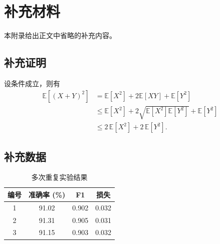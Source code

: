 
\chapter{补充材料}

本附录给出正文中省略的补充内容。

\section{补充证明}

设条件成立，则有
\begin{equation}
\begin{aligned}
\mathbb{E}[(X+Y)^2] &= \mathbb{E}[X^2] + 2\mathbb{E}[XY] + \mathbb{E}[Y^2] \\
&\leq \mathbb{E}[X^2] + 2\sqrt{\mathbb{E}[X^2]\mathbb{E}[Y^2]} + \mathbb{E}[Y^2] \\
&\leq 2\,\mathbb{E}[X^2] + 2\,\mathbb{E}[Y^2].
\end{aligned}
\end{equation}

\section{补充数据}

\begin{table}[htbp]
\centering
\caption{多次重复实验结果}
\begin{tabular}{cccc}
\toprule
编号 & 准确率 (\%) & F1 & 损失 \\
\midrule
1 & 91.02 & 0.902 & 0.032 \\
2 & 91.31 & 0.905 & 0.031 \\
3 & 91.15 & 0.903 & 0.032 \\
\bottomrule
\end{tabular}
\end{table}
